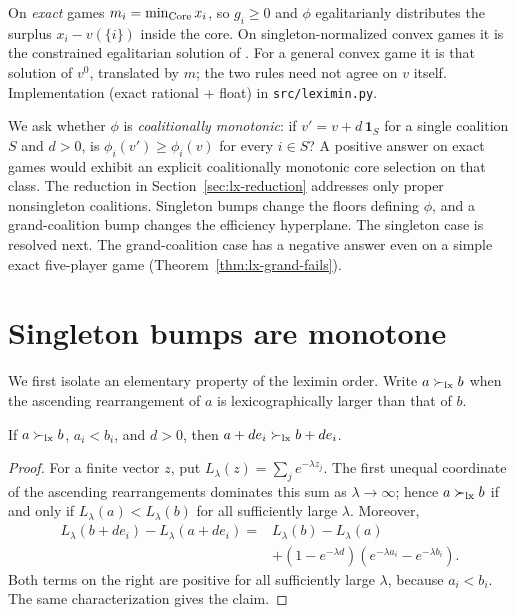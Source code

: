 On \emph{exact} games $m_i=\min_{\operatorname{Core}}x_i$, so
$g_i\ge 0$ and $\phi$ egalitarianly distributes the surplus $x_i-v(\{i\})$ inside
the core. On singleton-normalized convex games it is the constrained
egalitarian solution of \citet{DuttaRay89}. For a general convex game it is
that solution of $v^0$, translated by $m$; the two rules need not agree on
$v$ itself. Implementation (exact rational + float) in
\texttt{src/leximin.py}.

We ask whether $\phi$ is \emph{coalitionally monotonic}: if $v'=v+d\,\mathbf 1_S$
for a single coalition $S$ and $d>0$, is $\phi_i(v')\ge\phi_i(v)$ for every
$i\in S$? A positive answer on exact games would exhibit an explicit coalitionally
monotonic core selection on that class. The reduction in
Section~\ref{sec:lx-reduction} addresses only proper nonsingleton coalitions.
Singleton bumps change the floors defining $\phi$, and a grand-coalition bump
changes the efficiency hyperplane.  The singleton case is resolved next.  The
grand-coalition case has a negative answer even on a simple exact five-player
game (Theorem~\ref{thm:lx-grand-fails}).


\section{Singleton bumps are monotone}\label{sec:lx-singleton}

We first isolate an elementary property of the leximin order.  Write
$a\succ_{\rm lx}b$ when the ascending rearrangement of $a$ is
lexicographically larger than that of $b$.

\begin{lemma}\label{lem:lx-translation}
If $a\succ_{\rm lx}b$, $a_i<b_i$, and $d>0$, then
$a+d e_i\succ_{\rm lx}b+d e_i$.
\end{lemma}

\begin{proof}
For a finite vector $z$, put $L_\lambda(z)=\sum_j e^{-\lambda z_j}$.
The first unequal coordinate of the ascending rearrangements dominates this
sum as $\lambda\to\infty$; hence
$a\succ_{\rm lx}b$ if and only if
$L_\lambda(a)<L_\lambda(b)$ for all sufficiently large $\lambda$.
Moreover,
\begin{align*}
 L_\lambda(b+d e_i)-L_\lambda(a+d e_i)
 ={}&L_\lambda(b)-L_\lambda(a)\\
 &+(1-e^{-\lambda d})(e^{-\lambda a_i}-e^{-\lambda b_i}).
\end{align*}
Both terms on the right are positive for all sufficiently large $\lambda$,
because $a_i<b_i$.  The same characterization gives the claim.
\end{proof}

